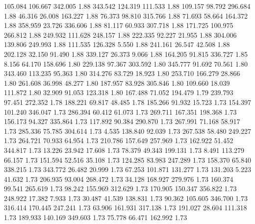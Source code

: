  105.084  106.667  342.005         1.88
 343.542  124.319  111.533         1.88
 109.157   98.792  296.684         1.88
  46.316   26.008  163.227         1.88
  76.373   98.810  315.766         1.88
  71.693   58.664  164.372         1.88
 358.959   23.726  336.606         1.88
  81.117   60.933  307.718         1.88
 171.725  100.975  266.812         1.88
 249.932  111.628  248.157         1.88
 222.335   92.227   21.955         1.88
 304.006  139.806  249.993         1.88
 111.535  126.328    5.550         1.88
 241.161   26.547   42.508         1.88
 202.128   32.150   91.490         1.88
 339.127   26.373    9.066         1.88
 164.205   91.815  336.727         1.85
   8.156   64.170  158.696         1.80
 229.138   97.367  303.592         1.80
 345.777   91.692   70.561         1.80
 343.460  113.235   95.363         1.80
 314.276   83.729   18.923         1.80
 253.710  166.279   28.866         1.80
 261.608   36.998   48.277         1.80
 187.957   83.928  305.846         1.80
 109.660   18.039  111.872         1.80
  32.909   91.053  123.318         1.80
 167.488   71.052  194.479         1.79
 239.793   97.451  272.352         1.78
 188.221   69.817   48.485         1.78
 185.266   91.932   15.723         1.73
 154.397  101.240  346.047         1.73
 286.394   60.412   61.073         1.73
 269.711  167.351  198.368         1.73
 156.173   94.327  335.864         1.73
 117.892   90.384  290.870         1.73
 267.991   71.168   58.917         1.73
 285.336   75.785  304.614         1.73
   4.535  138.840   92.039         1.73
 267.538   58.480  249.227         1.73
 264.721   70.933   64.954         1.73
 210.786  157.649  257.969         1.73
 162.922   51.452  344.817         1.73
  13.226   23.942   17.608         1.73
  78.379   49.343  199.131         1.73
   8.491  113.279   66.157         1.73
 151.594   52.516   35.108         1.73
 124.285   83.983  247.289         1.73
 158.370   65.840  338.215         1.73
 343.772   26.482   20.999         1.73
  67.253  101.871  131.277         1.73
 131.203    5.223   41.632         1.73
 206.935   93.004  268.472         1.73
  34.128  168.927  279.976         1.73
 160.374   99.541  265.619         1.73
  98.242  155.969  312.629         1.73
 170.905  150.347  356.822         1.73
 248.922   17.382    7.933         1.73
  30.487   41.539  138.831         1.73
  90.362  105.605  346.700         1.73
 316.414  170.445  247.241         1.73
  63.906  161.931  317.138         1.73
 191.027   28.604  111.318         1.73
 189.933  140.169  349.603         1.73
  75.778   66.471  162.992         1.73
